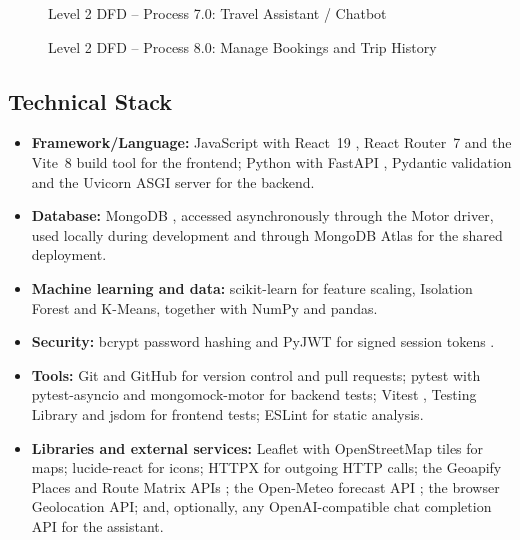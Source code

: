 \begin{figure}[htbp]
  \centering
  \caption{Level 2 DFD -- Process 7.0: Travel Assistant / Chatbot}
  \label{fig:dfd2-p7}
\end{figure}

\begin{figure}[htbp]
  \centering
  \caption{Level 2 DFD -- Process 8.0: Manage Bookings and Trip History}
  \label{fig:dfd2-p8}
\end{figure}

\FloatBarrier

\subsection{Technical Stack}

\begin{itemize}
  \item \textbf{Framework/Language:} JavaScript with React~19 \cite{react},
    React Router~7 and the Vite~8 build tool for the frontend; Python with
    FastAPI \cite{fastapi}, Pydantic validation and the Uvicorn ASGI server
    for the backend.
  \item \textbf{Database:} MongoDB \cite{mongodb}, accessed asynchronously
    through the Motor driver, used locally during development and through
    MongoDB Atlas for the shared deployment.
  \item \textbf{Machine learning and data:} scikit-learn
    \cite{pedregosa2011sklearn} for feature scaling, Isolation Forest and
    K-Means, together with NumPy and pandas.
  \item \textbf{Security:} bcrypt password hashing \cite{provos1999bcrypt}
    and PyJWT for signed session tokens \cite{rfc7519}.
  \item \textbf{Tools:} Git and GitHub for version control and pull
    requests; pytest \cite{pytest} with pytest-asyncio and mongomock-motor
    for backend tests; Vitest \cite{vitest}, Testing Library and jsdom for
    frontend tests; ESLint for static analysis.
  \item \textbf{Libraries and external services:} Leaflet \cite{leaflet}
    with OpenStreetMap tiles for maps; lucide-react for icons; HTTPX for
    outgoing HTTP calls; the Geoapify Places and Route Matrix APIs
    \cite{geoapify}; the Open-Meteo forecast API \cite{openmeteo}; the
    browser Geolocation API; and, optionally, any OpenAI-compatible chat
    completion API for the assistant.
\end{itemize}

